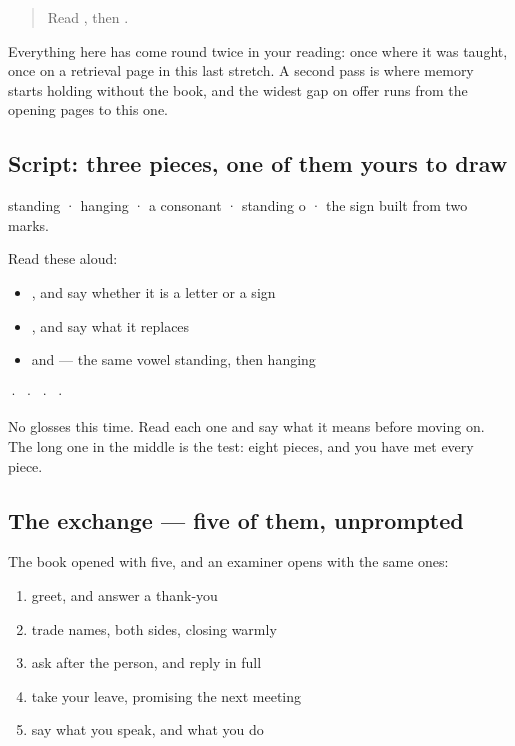 \begin{quote}
Read \textbf{}, then \textbf{}.
\end{quote}

\begin{grammarlens}[title={What you've built, and what this page does with it}]
Everything here has come round twice in your reading: once where it was taught, once on a retrieval page in this last stretch. A second pass is where memory starts holding without the book, and the widest gap on offer runs from the opening pages to this one.
\end{grammarlens}

\subsection*{Script: three pieces, one of them yours to draw}
\textbf{} standing · \textbf{} hanging · \textbf{} a consonant · \textbf{} standing o · \textbf{} the sign built from two marks.

Read these aloud:

\begin{itemize}
\raggedright
  \item \textbf{}, and say whether it is a letter or a sign
  \item \textbf{}, and say what it replaces
  \item \textbf{} and \textbf{} — the same vowel standing, then hanging
\end{itemize}

\begin{tcolorbox}[breakable,skin=enhanced,colback=orange!6,colframe=orange!45!black,boxrule=0.5pt,arc=1mm,left=6pt,right=6pt,top=4pt,bottom=4pt,fonttitle=\bfseries,title={Read this}]
\textbf{} · \textbf{} · \textbf{} · \textbf{} · \textbf{}

No glosses this time. Read each one and say what it means before moving on. The long one in the middle is the test: eight pieces, and you have met every piece.
\end{tcolorbox}

\subsection*{The exchange — five of them, unprompted}
The book opened with five, and an examiner opens with the same ones:

\begin{enumerate}
\raggedright
  \item greet, and answer a thank-you
  \item trade names, both sides, closing warmly
  \item ask after the person, and reply in full
  \item take your leave, promising the next meeting
  \item say what you speak, and what you do
\end{enumerate}

